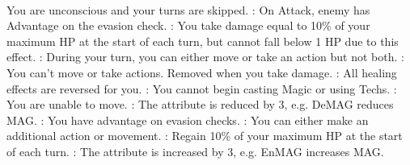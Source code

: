 \documentclass[a4paper, titlepage, 11pt, twocolumn] {article}
\begin{document}
{\begin{multicols}{2}
{	}
	\columnbreak\\
	\parbox{1.03\columnwidth}{
		\scriptsize	
		\hfill{}\hfill\ofrow
		\kosmall{} You are unconscious and your turns are skipped.\ofrow
		\blindsmall{}: On Attack, enemy has Advantage on the evasion check. \ofrow
		\poisonsmall{}: You take damage equal to 10\% of your maximum HP at the start of each turn, but cannot fall below 1 HP due to this effect.\ofrow
		\slowsmall{}: During your turn, you can either move or take an action but not both.\ofrow
		\sleepsmall{}: You can't move or take actions. Removed when you take damage.\ofrow
		\zombiesmall{}: All healing effects are reversed for you.\ofrow
		\silencesmall{}: You cannot begin casting Magic or using Techs.\ofrow
		\immobilesmall{}: You are unable to move. \ofrow
		\destrsmall\dedefsmall\demagsmall\deressmall{}: The attribute is reduced by 3, e.g. DeMAG reduces MAG. \ofrow
		\blinksmall{}: You have advantage on evasion checks. \ofrow
		\hastesmall{}: You can either make an additional action or movement. \ofrow
		\regensmall{}: Regain 10\% of your maximum HP at the start of each turn.\ofrow
		\enstrsmall\enndefsmall\enmagsmall\enressmall{}: The attribute is increased by 3, e.g. EnMAG increases MAG. \ofrow
	}
	\end{multicols}
}
\end{document}
